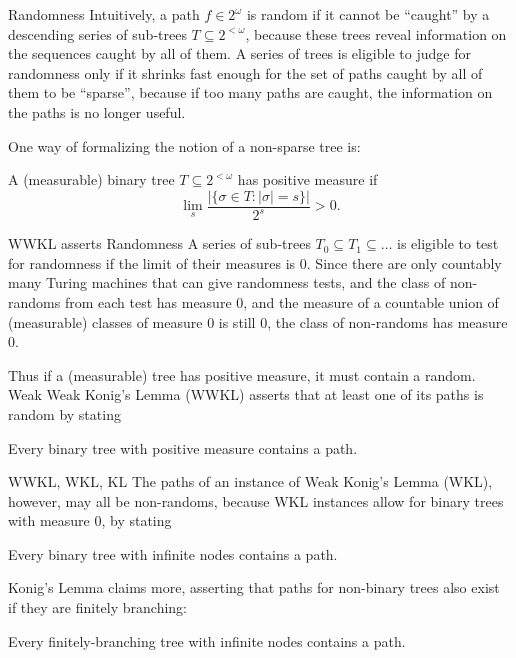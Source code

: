 \begin{frame}{Randomness}
  Intuitively, a path $f\in2^\omega$ is random if it cannot be ``caught''
  by a descending series of sub-trees $T\subseteq2^{<\omega}$, because
  these trees reveal information on the sequences caught by all of them. A
  series of trees is eligible to judge for randomness only if it shrinks
  fast enough for the set of paths caught by all of them to be ``sparse'',
  because if too many paths are caught, the information on the paths is no
  longer useful.

  \vspace{1em}
  One way of formalizing the notion of a non-sparse tree is:
  \begin{define*}
    A (measurable) binary tree $T\subseteq2^{<\omega}$ has positive measure
    if
    \[\lim_s \frac{|\{\sigma\in T: |\sigma|=s\}|}{2^s} >0.\]
  \end{define*}
\end{frame}

\begin{frame}{WWKL asserts Randomness}
  A series of sub-trees $T_0\subseteq T_1\subseteq\ldots$ is eligible to
  test for randomness if the limit of their measures is 0. Since there are
  only countably many Turing machines that can give randomness tests,
  and the class of non-randoms from each test has measure 0, and the
  measure of a countable union of (measurable) classes of measure 0 is
  still 0, the class of non-randoms has measure 0.

  \vspace{2em}
  Thus if a (measurable) tree has positive measure, it must contain a
  random. Weak Weak Konig's Lemma (WWKL) asserts that at least one of its
  paths is random by stating
  \begin{thm*}
    Every binary tree with positive measure contains a path.
  \end{thm*}
\end{frame}

\begin{frame}{WWKL, WKL, KL}
  The paths of an instance of Weak Konig's Lemma (WKL), however, may
  all be non-randoms, because WKL instances allow for binary trees with
  measure 0, by stating
  \begin{thm*}
    Every binary tree with infinite nodes contains a path.
  \end{thm*}

  \vspace{2em}
  Konig's Lemma claims more, asserting that paths for non-binary
  trees also exist if they are finitely branching: 
  \begin{thm*}
    Every finitely-branching tree with infinite nodes contains a path.
  \end{thm*}
\end{frame}

